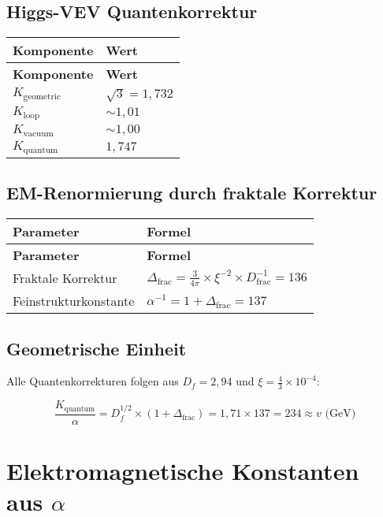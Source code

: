 \documentclass[12pt,a4paper]{article}
\begin{document}
\subsection{Higgs-VEV Quantenkorrektur}

\begin{longtable}{|p{3cm}|p{4cm}|}
	\hline
	\textbf{Komponente} & \textbf{Wert} \\
	\hline
	\endfirsthead
	\hline
	\textbf{Komponente} & \textbf{Wert} \\
	\hline
	\endhead
	\(K_{\text{geometric}}\) & \(\sqrt{3} = 1{,}732\) \\
	\hline
	\(K_{\text{loop}}\) & \(\sim 1{,}01\) \\
	\hline
	\(K_{\text{vacuum}}\) & \(\sim 1{,}00\) \\
	\hline
	\(K_{\text{quantum}}\) & \(1{,}747\) \\
	\hline
\end{longtable}

\subsection{EM-Renormierung durch fraktale Korrektur}

\begin{longtable}{|p{4cm}|p{5cm}|}
	\hline
	\textbf{Parameter} & \textbf{Formel} \\
	\hline
	\endfirsthead
	\hline
	\textbf{Parameter} & \textbf{Formel} \\
	\hline
	\endhead
	Fraktale Korrektur & \(\Delta_{\text{frac}} = \frac{3}{4\pi} \times \xi^{-2} \times D_{\text{frac}}^{-1} = 136\) \\
	\hline
	Feinstrukturkonstante & \(\alpha^{-1} = 1 + \Delta_{\text{frac}} = 137\) \\
	\hline
\end{longtable}

\subsection{Geometrische Einheit}

Alle Quantenkorrekturen folgen aus \(D_f = 2{,}94\) und \(\xi = \frac{4}{3} \times 10^{-4}\):

\begin{equation}
	\frac{K_{\text{quantum}}}{\alpha} = D_f^{1/2} \times (1 + \Delta_{\text{frac}}) = 1{,}71 \times 137 = 234 \approx v \text{ (GeV)}
\end{equation}
	\section{Elektromagnetische Konstanten aus \(\alpha\)}
	
\end{document}
